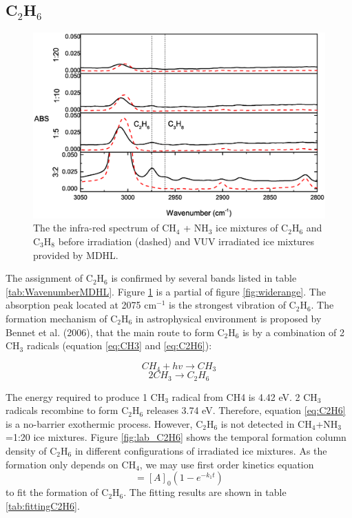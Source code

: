 \subsection{C$_2$H$_6$}

\begin{figure}
\centering
\includegraphics[width=\textwidth]{figures/chapter3/C2H6.eps}
\caption{The the infra-red spectrum of CH$_4$ + NH$_3$ ice mixtures of C$_2$H$_6$ and C$_3$H$_8$ before irradiation (dashed) and VUV irradiated ice mixtures provided by MDHL. }
\label{fig:C2H6}
\end{figure}

The assignment of C$_2$H$_6$ is confirmed by several bands listed in table \ref{tab:WavenumberMDHL}. Figure \ref{fig:C2H6} is a partial of figure \ref{fig:widerange}. The absorption peak located at 2075 cm$^{-1}$ is the strongest vibration of C$_2$H$_6$. The formation mechanism of C$_2$H$_6$ in astrophysical environment is proposed by Bennet et al. (2006), that the main route to form C$_2$H$_6$ is by a combination of 2 CH$_3$ radicals (equation \ref{eq:CH3} and \ref{eq:C2H6}):

\begin{equation}
CH_4 + hv \rightarrow CH_3
\label{eq:CH3}
\end{equation}
\begin{equation}
2 CH_3 \rightarrow C_2H_6
\label{eq:C2H6}
\end{equation}

The energy required to produce 1 CH$_3$ radical from CH4 is 4.42 eV. 2 CH$_3$ radicals recombine to form C$_2$H$_6$ releases 3.74 eV. Therefore, equation \ref{eq:C2H6} is a no-barrier exothermic process. However, C$_2$H$_6$ is not detected in CH$_4$+NH$_3$=1:20 ice mixtures. Figure \ref{fig:lab_C2H6} shows the temporal formation column density of C$_2$H$_6$ in different configurations of irradiated ice mixtures.  As the formation only depends on CH$_4$, we may use first order kinetics equation
\begin{equation}
[A] = [A]_0(1 - e^{-k_1 t})
\label{eq:1step}
\end{equation}
to fit the formation of C$_2$H$_6$. The fitting results are shown in table \ref{tab:fittingC2H6}.

